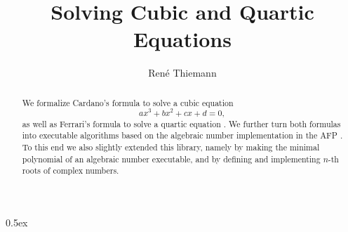 \documentclass[11pt,a4paper]{article}
\begin{document}
\title{Solving Cubic and Quartic Equations}
\author{Ren\'e Thiemann}
\maketitle

\begin{abstract}
We formalize Cardano's formula to solve a cubic equation 
\[
ax^3 + bx^2 + cx + d = 0,
\]
as well as Ferrari's formula to solve a quartic equation \cite{AM}. 
We further turn both formulas into executable algorithms 
based on the algebraic number implementation in the AFP \cite{Algebraic_Numbers-AFP}. 
To this end we also slightly extended this library, namely by making
the minimal polynomial of an algebraic number executable, and by defining and
implementing $n$-th roots of complex numbers.
\end{abstract}

\tableofcontents

\parindent 0pt\parskip 0.5ex





\end{document}
